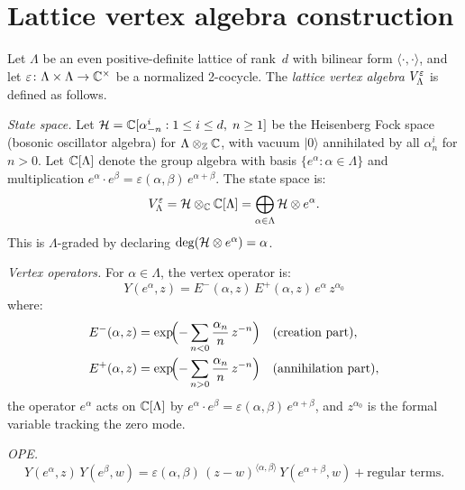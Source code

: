 \section{Lattice vertex algebra construction}
\label{sec:lattice:construction}

\begin{construction}\label{constr:lattice:va}
Let $\Lambda$ be an even positive-definite lattice of rank~$d$ with
bilinear form $\langle \cdot, \cdot \rangle$, and let
$\varepsilon \colon \Lambda \times \Lambda \to \mathbb{C}^\times$ be a
normalized 2-cocycle. The \emph{lattice vertex algebra}
$V_\Lambda^\varepsilon$ is defined as follows.

\noindent\emph{State space.}
Let $\mathcal{H} = \mathbb{C}[\alpha^i_{-n} : 1 \leq i \leq d,\; n \geq 1]$ be the
Heisenberg Fock space (bosonic oscillator algebra) for
$\Lambda \otimes_{\mathbb{Z}} \mathbb{C}$, with vacuum $|0\rangle$ annihilated by all
$\alpha^i_n$ for $n > 0$. Let $\mathbb{C}[\Lambda]$ denote the group algebra
with basis $\{e^\alpha : \alpha \in \Lambda\}$ and multiplication
$e^\alpha \cdot e^\beta = \varepsilon(\alpha,\beta)\, e^{\alpha+\beta}$.
The state space is:
\begin{equation}\label{eq:lattice:state-space}
V_\Lambda^\varepsilon
= \mathcal{H} \otimes_{\mathbb{C}} \mathbb{C}[\Lambda]
= \bigoplus_{\alpha \in \Lambda} \mathcal{H} \otimes e^\alpha.
\end{equation}
This is $\Lambda$-graded by declaring
$\deg(\mathcal{H} \otimes e^\alpha) = \alpha$.

\noindent\emph{Vertex operators.}
For $\alpha \in \Lambda$, the vertex operator is:
\begin{equation}\label{eq:lattice:vertex-op}
Y(e^\alpha, z) = E^-(\alpha, z)\, E^+(\alpha, z)\, e^\alpha\, z^{\alpha_0}
\end{equation}
where:
\begin{align*}
E^-(\alpha, z)
&= \exp\!\Bigl(-\sum_{n < 0} \frac{\alpha_n}{n}\, z^{-n}\Bigr)
  \quad \text{(creation part)}, \\
E^+(\alpha, z)
&= \exp\!\Bigl(-\sum_{n > 0} \frac{\alpha_n}{n}\, z^{-n}\Bigr)
  \quad \text{(annihilation part)},
\end{align*}
the operator $e^\alpha$ acts on $\mathbb{C}[\Lambda]$ by
$e^\alpha \cdot e^\beta = \varepsilon(\alpha,\beta)\,e^{\alpha+\beta}$,
and $z^{\alpha_0}$ is the formal variable tracking the zero mode.

\noindent\emph{OPE.}
\begin{equation}\label{eq:lattice:ope}
Y(e^\alpha, z)\, Y(e^\beta, w)
= \varepsilon(\alpha, \beta)\, (z-w)^{\langle\alpha,\beta\rangle}\,
  Y(e^{\alpha+\beta}, w) + \text{regular terms}.
\end{equation}


\end{construction}

